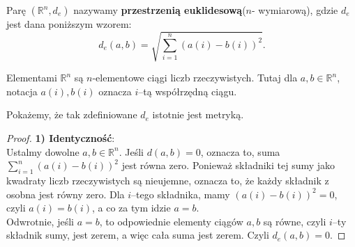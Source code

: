 \begin{definition}
	Parę $\left( \mathbb{R}^{n}, d_{e} \right) $ nazywamy \textbf{przestrzenią euklidesową}($n$- wymiarową), gdzie $d_{e}$ jest dana poniższym wzorem:
	\[
	d _{e}\left( a,b \right) = \sqrt{\sum_{i=1}^{n} \left( a\left( i \right) - b\left( i \right)  \right)^2 } 
	.\] 

	Elementami $\mathbb{R}^{n}$ są $n$-elementowe ciągi liczb rzeczywistych. Tutaj dla  $a, b \in \mathbb{R}^{n}$, notacja $a\left( i \right) , b\left( i \right) $ oznacza $i$--tą współrzędną ciągu.
\end{definition} 
Pokażemy, że tak zdefiniowane $d_{e}$ istotnie jest metryką.
\begin{proof}
\noindent \textbf{1) Identyczność}:\\ 
	Ustalmy dowolne $a,b \in \mathbb{R}^{n}$. Jeśli $d\left( a,b \right) = 0 $, oznacza to, suma $\sum_{i=1}^{n} \left( a\left( i \right) - b\left( i \right)  \right)^2$ jest równa zero. Ponieważ składniki tej sumy jako kwadraty liczb rzeczywistych są nieujemne, oznacza to, że każdy składnik z osobna jest równy zero. Dla $i$--tego składnika, mamy $\left( a\left( i \right) - b\left( i \right)  \right) ^2 = 0$, czyli $a\left( i \right) = b\left( i \right) $, a co za tym idzie $a = b$. \\ Odwrotnie, jeśli $a = b$, to odpowiednie elementy ciągów $a,b$ są równe, czyli $i$--ty składnik sumy, jest zerem, a więc cała suma jest zerem. Czyli $d_{e}\left( a,b \right) = 0$.


\end{proof}
